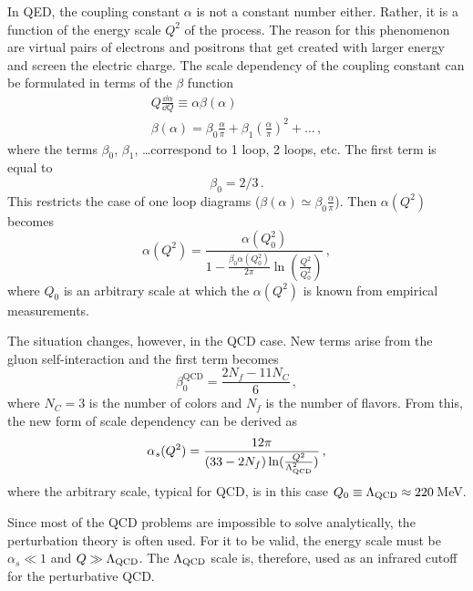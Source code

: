 In QED, the coupling constant $\alpha$ is not a constant number either. Rather, it is a function of the energy scale $Q^2$ of the process. The reason for this phenomenon are virtual pairs of electrons and positrons that get created with larger energy and screen the electric charge. The scale dependency of the coupling constant can be formulated in terms of the $\beta$ function 
\begin{equation}
\begin{gathered}
 Q\frac{\dd\alpha}{\dd Q} \equiv  \alpha\beta(\alpha) \\
 \beta(\alpha) =  \beta_0\frac{\alpha}{\pi} + \beta_1 \left(\frac{\alpha}{\pi}\right)^2 + \dots \,,
 \end{gathered}
\end{equation}
where the terms $\beta_0$, $\beta_1$, \dots correspond to 1 loop, 2 loops, etc. The first term is equal to
\begin{equation}
 \beta_0 = 2/3\,.
\end{equation}
This restricts the case of one loop diagrams ($\beta(\alpha)\simeq \beta_0\frac{\alpha}{\pi}$). Then $\alpha(Q^2)$ becomes
\begin{equation}
 \alpha(Q^2) =  \frac{\alpha (Q_0^2)}{1 - \frac{\beta_0 \alpha (Q_0^2)}{2\pi} \ln(\frac{Q^2}{Q_0^2})}\,,
\end{equation}
where $Q_0$ is an arbitrary scale at which the $\alpha(Q^2)$ is known from empirical measurements.

The situation changes, however, in the QCD case. New terms arise from the gluon self-interaction and the first term becomes
\begin{equation}
 \beta_0^\mathrm{QCD} =  \frac{2N_f - 11N_C}{6}\,,
\end{equation}
where $N_C = 3$ is the number of colors and $N_f$ is the number of flavors. From this, the new form of scale dependency can be derived as 
\begin{equation} \label{alphaQCD}
 \alpha_s(Q^2) = \frac{12\pi}{(33 - 2 N_f) \ln (\frac{Q^2}{\Lambda_\mathrm{QCD}^2})}\,,
\end{equation}
where the arbitrary scale, typical for QCD, is in this case $Q_0 \equiv \Lambda_\mathrm{QCD} \approx 220\,$MeV\@.

Since most of the QCD problems are impossible to solve analytically, the perturbation theory is often used. For it to be valid, the energy scale must be $\alpha_s \ll 1$ and $Q \gg \Lambda_\mathrm{QCD}$\@. The $\Lambda_\mathrm{QCD}$ scale is, therefore, used as an infrared cutoff for the perturbative QCD\@.

